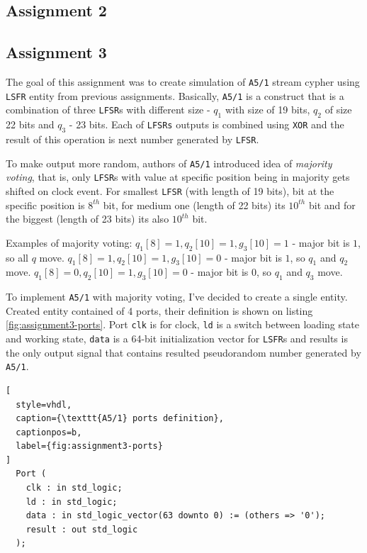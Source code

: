 \subsection{Assignment 2}

\subsection{Assignment 3}
The goal of this assignment was to create simulation of \texttt{A5/1} stream
cypher using \texttt{LSFR} entity from previous assignments. Basically,
\texttt{A5/1} is a construct that is a combination of three \texttt{LFSR}s
with different size - $q_1$ with size of 19 bits, $q_2$ of size 22 bits and
$q_3$ - 23 bits. Each of \texttt{LFSRs} outputs is combined using \texttt{XOR}
and the result of this operation is next number generated by \texttt{LFSR}.

To make output more random, authors of \texttt{A5/1} introduced idea of
\textit{majority voting}, that is, only \texttt{LFSR}s with value at specific
position being in majority gets shifted on clock event. For smallest
\texttt{LFSR} (with length of 19 bits), bit at the specific position is $8^{th}$
bit, for medium one (length of 22 bits) its $10^{th}$ bit and for the biggest
 (length of 23 bits) its also $10^{th}$ bit.

 Examples of majority voting:
 $q_1[8] = 1, q_2[10] = 1, g_3[10] = 1$ - major bit is $1$, so all $q$ move.
 $q_1[8] = 1, q_2[10] = 1, g_3[10] = 0$ - major bit is $1$, so $q_1$ and $q_2$ move.
 $q_1[8] = 0, q_2[10] = 1, g_3[10] = 0$ - major bit is $0$, so $q_1$ and $q_3$ move.

To implement \texttt{A5/1} with majority voting, I've decided to create a single
entity. Created entity contained of 4 ports, their definition is shown on
listing \ref{fig:assignment3-ports}. Port \texttt{clk} is for clock,
\texttt{ld} is a switch between loading state and working state,
\texttt{data} is a 64-bit initialization vector for \texttt{LSFR}s and
results is the only output signal that contains resulted pseudorandom number
generated by \texttt{A5/1}.

\begin{lstlisting}[
  style=vhdl,
  caption={\texttt{A5/1} ports definition},
  captionpos=b,
  label={fig:assignment3-ports}
]
  Port (
    clk : in std_logic;
    ld : in std_logic;
    data : in std_logic_vector(63 downto 0) := (others => '0');
    result : out std_logic
  );
\end{lstlisting}

